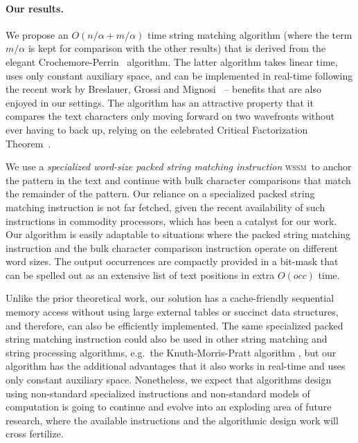 \documentclass[12pt]{article}
\newcommand{\C}{{\alpha}}
\newcommand{\wssm}{\textsc{wssm}}
\begin{document}
\paragraph{Our results.}
We propose an $O(n/\C+m/\C)$ time string matching algorithm (where the
term $m/\C$ is kept for comparison with the other results) that is
derived from the elegant Crochemore-Perrin~\cite{cp:91} algorithm.
The latter algorithm takes linear time, uses only constant auxiliary space, and
can be implemented in real-time following the recent work by
Breslauer, Grossi and Mignosi~\cite{bgm:11} -- benefits that are also
enjoyed in our settings.  The algorithm has an attractive property
that it compares the text characters only moving forward on two
wavefronts without ever having to back up, relying on the celebrated
Critical Factorization Theorem~\cite{cv:78,lothaire-book:83}.

We use  a {\em specialized word-size packed string matching instruction} \wssm\ to
anchor the pattern in the text
and continue with bulk character comparisons that match
the remainder of the pattern.
Our reliance on a specialized packed string matching
instruction is not far fetched, given the recent availability of such instructions
in  commodity processors,
which has been a catalyst for our work.
Our algorithm is easily adaptable to situations where
the packed string matching instruction and the bulk character
comparison instruction operate on different word sizes.
The output occurrences are compactly provided in a bit-mask that can be spelled
out as an extensive list of text positions in extra $O(occ)$ time.

Unlike the prior theoretical work,
our solution has a cache-friendly sequential memory access
without using large external tables or succinct data structures, and
therefore, can also be efficiently implemented.
The same specialized packed string matching instruction could also be used
in other string matching and string processing algorithms, 
e.g.~the Knuth-Morris-Pratt algorithm
\cite[\S 10.3.3]{intel-optimization:11}, 
but our algorithm has the additional advantages that it
also works in real-time and
uses only constant auxiliary space.
Nonetheless, we expect that algorithms design using non-standard
specialized instructions and non-standard models of computation is 
going to continue and evolve into an exploding area of future research, where
the available instructions and the algorithmic design work will
cross fertilize.
\end{document}
